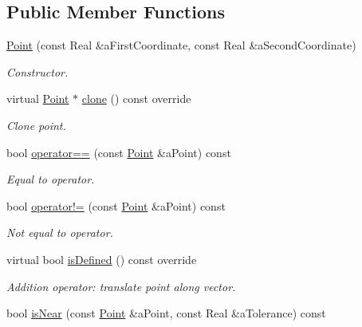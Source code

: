 \subsection*{Public Member Functions}
\begin{DoxyCompactItemize}
\item 
\hyperlink{classlibrary_1_1math_1_1geom_1_1d2_1_1objects_1_1_point_a4998aefdf80bdfd967f21d49fa050398}{Point} (const Real \&a\+First\+Coordinate, const Real \&a\+Second\+Coordinate)
\begin{DoxyCompactList}\small\item\em Constructor. \end{DoxyCompactList}\item 
virtual \hyperlink{classlibrary_1_1math_1_1geom_1_1d2_1_1objects_1_1_point}{Point} $\ast$ \hyperlink{classlibrary_1_1math_1_1geom_1_1d2_1_1objects_1_1_point_aa6b55bdbf5a0ce9ec8bc91ca79de3569}{clone} () const override
\begin{DoxyCompactList}\small\item\em Clone point. \end{DoxyCompactList}\item 
bool \hyperlink{classlibrary_1_1math_1_1geom_1_1d2_1_1objects_1_1_point_af5223d8e73deaf75ac248a5d43139628}{operator==} (const \hyperlink{classlibrary_1_1math_1_1geom_1_1d2_1_1objects_1_1_point}{Point} \&a\+Point) const
\begin{DoxyCompactList}\small\item\em Equal to operator. \end{DoxyCompactList}\item 
bool \hyperlink{classlibrary_1_1math_1_1geom_1_1d2_1_1objects_1_1_point_ac3a7bf1647172166e83a016ca32669c3}{operator!=} (const \hyperlink{classlibrary_1_1math_1_1geom_1_1d2_1_1objects_1_1_point}{Point} \&a\+Point) const
\begin{DoxyCompactList}\small\item\em Not equal to operator. \end{DoxyCompactList}\item 
virtual bool \hyperlink{classlibrary_1_1math_1_1geom_1_1d2_1_1objects_1_1_point_ac90251968d8eb11df82e28f6cf095e5c}{is\+Defined} () const override
\begin{DoxyCompactList}\small\item\em Addition operator\+: translate point along vector. \end{DoxyCompactList}\item 
bool \hyperlink{classlibrary_1_1math_1_1geom_1_1d2_1_1objects_1_1_point_aeec1bab241792dc6b6091d9cac36d02e}{is\+Near} (const \hyperlink{classlibrary_1_1math_1_1geom_1_1d2_1_1objects_1_1_point}{Point} \&a\+Point, const Real \&a\+Tolerance) const

\end{DoxyCompactItemize}
